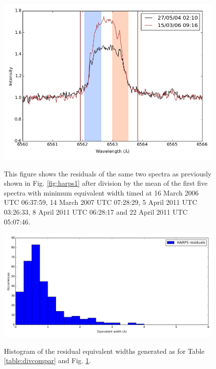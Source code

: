 \begin{figure}[!htbp]
\begin{center}
\includegraphics[scale=0.4]{Figures/harpsfirsthad5.png} \\
\end{center}   
\caption{This figure shows the residuals of the same two spectra as previously shown in Fig. \ref{fig:harps1} after
  division by the mean of the first five spectra with minimum equivalent width timed at 16 March 2006 UTC 06:37:59, 14
  March 2007 UTC 07:28:29, 5 April 2011 UTC 03:26:33, 8 April 2011 UTC 06:28:17 and 22 April 2011 UTC 05:07:46.}
\protect\label{fig:harpsfirsthad5}
\end{figure}

\begin{figure}[!htbp]
\begin{center}
\includegraphics[scale=0.4]{Figures/residhists.png} \\
\end{center}   
\caption{Histogram of the residual equivalent widths generated as for Table \ref{table:divcompar} and Fig. \ref{fig:harpsfirsthad5}.}
\protect\label{fig:residhists}
\end{figure}

